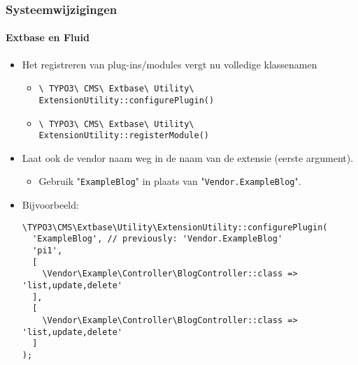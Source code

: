 
\begin{frame}[fragile]
	\frametitle{Systeemwijzigingen}
	\framesubtitle{Extbase en Fluid}

	\lstset{basicstyle=\tiny\ttfamily}

	\begin{itemize}
		\item Het registreren van plug-ins/modules vergt nu volledige klassenamen

			\begin{itemize}\smaller
				\item \texttt{\textbackslash
					TYPO3\textbackslash
					CMS\textbackslash
					Extbase\textbackslash
					Utility\textbackslash
					ExtensionUtility::configurePlugin()}
				\item \texttt{\textbackslash
					TYPO3\textbackslash
					CMS\textbackslash
					Extbase\textbackslash
					Utility\textbackslash
					ExtensionUtility::registerModule()}
			\end{itemize}\normalsize

		\item Laat ook de vendor naam weg in de naam van de extensie (eerste argument).

			\begin{itemize}\smaller
				\item[\ding{228}] Gebruik "\texttt{ExampleBlog}" in plaats van "\texttt{Vendor.ExampleBlog}".
			\end{itemize}

		\item Bijvoorbeeld:
\begin{lstlisting}
\TYPO3\CMS\Extbase\Utility\ExtensionUtility::configurePlugin(
  'ExampleBlog', // previously: 'Vendor.ExampleBlog'
  'pi1',
  [
    \Vendor\Example\Controller\BlogController::class => 'list,update,delete'
  ],
  [
    \Vendor\Example\Controller\BlogController::class => 'list,update,delete'
  ]
);
\end{lstlisting}

	\end{itemize}

\end{frame}


